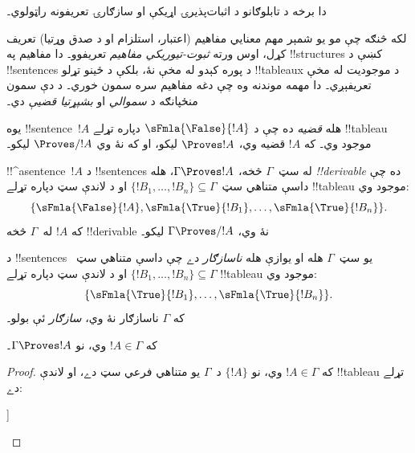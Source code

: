 \documentclass[../../../include/open-logic-section]{subfiles}
\begin{document}
      {}
      {}
      

\begin{editorial}
دا برخه د تابلوګانو د اثبات‌پذيرۍ اړيکې او سازګارۍ تعريفونه
راټولوي۔
\end{editorial}

\begin{explain}
لکه څنګه چې مو يو شمېر مهم معنايي مفاهيم (اعتبار، استلزام او د
صدق وړتيا) تعريف کړل، اوس ورته \emph{ثبوت-تيوريکي مفاهيم}
تعريفوو۔ دا مفاهيم په !!{structure}s کښې د !!{sentence}s د پوره
کېدو له مخې نۀ، بلکې د ځينو تړلو !!{tableau}x د موجوديت له مخې
تعريفېږي۔ دا مهمه موندنه وه چې دغه مفاهيم سره سمون خوري۔ د دې
سمون منځپانګه د \emph{سموالي} او \emph{بشپړتيا قضيې} دي۔
\end{explain}


\begin{defn}[قضيې]
يوه !!{sentence}~$!A$ هله \emph{قضيه} ده چې د
$\sFmla{\False}{!A}$ دپاره تړلے !!{tableau} موجود وي۔ که $!A$
قضيه وي، $\Proves !A$ ليکو، او که نۀ وي $\Proves/ !A$ ليکو۔
\end{defn}

\begin{defn}[!!^{derivability}]
!!^a{sentence}~$!A$ د !!{sentence}s له سټ~$\Gamma$ څخه،
$\Gamma \Proves !A$، هله \emph{!!{derivable}} ده چې داسې متناهي
سټ~$\{!B_1, \dots, !B_n\} \subseteq \Gamma$ او د لاندې سټ دپاره
تړلے !!{tableau} موجود وي:
\[
\{
  \sFmla{\False}{!A},
  \sFmla{\True}{!B_1}, \dots,
  \sFmla{\True}{!B_n}
  \}.
\]
که $!A$ له~$\Gamma$ څخه !!{derivable} نۀ وي،
$\Gamma \Proves/ !A$ ليکو۔
\end{defn}

\begin{defn}[سازګاري]
د !!{sentence}s يو سټ~$\Gamma$ هله او يوازې هله \emph{ناسازګار}
دے چې داسې متناهي سټ~$\{!B_1, \dots, !B_n\} \subseteq \Gamma$
او د لاندې سټ دپاره تړلے !!{tableau} موجود وي:
\[
\{
  \sFmla{\True}{!B_1}, \dots,
  \sFmla{\True}{!B_n}  
  \}.
\]
که $\Gamma$ ناسازګار نۀ وي، \emph{سازګار} ئې بولو۔
\end{defn}

\begin{prop}[انعکاسيت]
که $!A \in \Gamma$ وي، نو $\Gamma \Proves !A$۔
\end{prop}

\begin{proof}
که $!A \in \Gamma$ وي، نو $\{!A\}$ د~$\Gamma$ يو متناهي فرعي سټ
دے، او لاندې !!{tableau} تړلے دے:
\begin{oltableau}
  [\sFmla{\False}{\formula{A}}, just = \TAss
    [\sFmla{\True}{\formula{A}}, just = \TAss,close]
  ]
\end{oltableau}
\end{proof}
  
\end{document}
